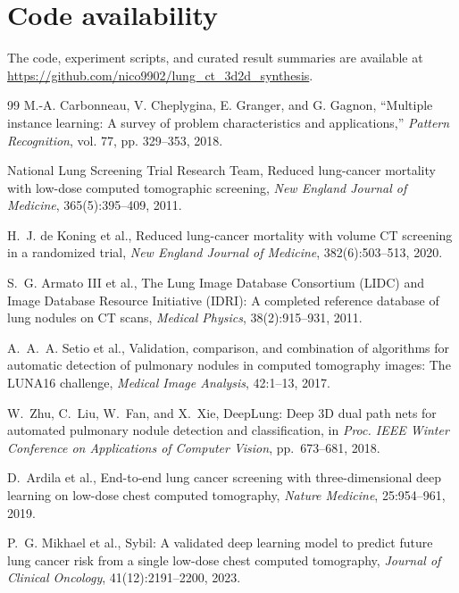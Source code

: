 \documentclass[preprint,12pt]{elsarticle}
\begin{document}
\section*{Code availability}

The code, experiment scripts, and curated result summaries are available at \url{https://github.com/nico9902/lung_ct_3d2d_synthesis}.

\begin{thebibliography}{99}
M.-A. Carbonneau, V. Cheplygina, E. Granger, and G. Gagnon,
``Multiple instance learning: A survey of problem characteristics and applications,''
\textit{Pattern Recognition}, vol. 77, pp. 329--353, 2018.

National Lung Screening Trial Research Team,
\newblock Reduced lung-cancer mortality with low-dose computed tomographic screening,
\newblock \emph{New England Journal of Medicine}, 365(5):395--409, 2011.

H.~J. de Koning et al.,
\newblock Reduced lung-cancer mortality with volume CT screening in a randomized trial,
\newblock \emph{New England Journal of Medicine}, 382(6):503--513, 2020.

S.~G. Armato III et al.,
\newblock The Lung Image Database Consortium (LIDC) and Image Database Resource Initiative (IDRI): A completed reference database of lung nodules on CT scans,
\newblock \emph{Medical Physics}, 38(2):915--931, 2011.

A.~A.~A. Setio et al.,
\newblock Validation, comparison, and combination of algorithms for automatic detection of pulmonary nodules in computed tomography images: The LUNA16 challenge,
\newblock \emph{Medical Image Analysis}, 42:1--13, 2017.

W.~Zhu, C.~Liu, W.~Fan, and X.~Xie,
\newblock DeepLung: Deep 3D dual path nets for automated pulmonary nodule detection and classification,
\newblock in \emph{Proc. IEEE Winter Conference on Applications of Computer Vision}, pp.~673--681, 2018.

D.~Ardila et al.,
\newblock End-to-end lung cancer screening with three-dimensional deep learning on low-dose chest computed tomography,
\newblock \emph{Nature Medicine}, 25:954--961, 2019.

P.~G. Mikhael et al.,
\newblock Sybil: A validated deep learning model to predict future lung cancer risk from a single low-dose chest computed tomography,
\newblock \emph{Journal of Clinical Oncology}, 41(12):2191--2200, 2023.


\end{thebibliography}
\end{document}
